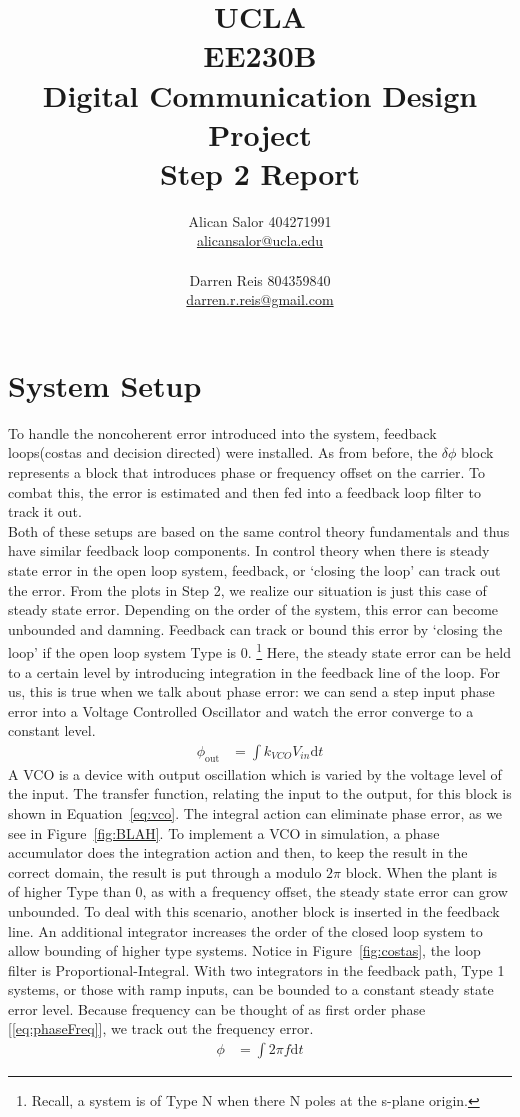 \documentclass[]{article}
\title{UCLA\\EE230B\\Digital Communication Design Project\\Step 2 Report}
\author{Alican Salor 404271991 \\  \href{mailto:alicansalor@ucla.edu}{alicansalor@ucla.edu} \\ \\
Darren Reis 804359840 \\
\href{mailto:darrer.r.reis@gmail.com}{darren.r.reis@gmail.com} }
\begin{document}
\maketitle

\newpage
\tableofcontents

\newpage


\section{System Setup}
\label{sec:setup}
To handle the noncoherent error introduced into the system, feedback loops(costas and decision directed) were installed.  As from before, the $\delta\phi$ block represents a block that introduces phase or frequency offset on the carrier.  To combat this, the error is estimated and then fed into a feedback loop filter to track it out. \\

Both of these setups are based on the same control theory fundamentals and thus have similar feedback loop components. In control theory when there is steady state error in the open loop system, feedback, or `closing the loop' can track out the error.  From the plots in Step 2, we realize our situation is just this case of steady state error.  Depending on the order of the system, this error can become unbounded and damning.  Feedback can track or bound this error by `closing the loop' if the open loop system Type is 0.  \footnote{Recall, a system is of Type N when there N poles at the s-plane origin.}  Here, the steady state error can be held to a certain level by introducing integration in the feedback line of the loop.  For us, this is true when we talk about phase error: we can send a step input phase error into a Voltage Controlled Oscillator and watch the error converge to a constant level. 
\begin{align}
\label{eq:vco}
\phi_{\text{out}} &= \int \! k_{VCO}V_{in} \mathrm{d}t
\end{align}
A VCO is a device with output oscillation which is varied by the voltage level of the input.  The transfer function, relating the input to the output, for this block is shown in Equation~\ref{eq:vco}. The integral action can eliminate phase error, as we see in Figure~\ref{fig:BLAH}.  To implement a VCO in simulation, a phase accumulator does the integration   action and then, to keep the result in the correct domain, the result is put through a modulo $2\pi$ block.   
When the plant is of higher Type than 0, as with a frequency offset, the steady state error can grow unbounded.  To deal with this scenario, another block is inserted in the feedback line.  An additional integrator increases the order of the closed loop system to allow bounding of higher type systems.  Notice in Figure~\ref{fig:costas}, the loop filter is Proportional-Integral.  With two integrators in the feedback path, Type 1 systems, or those with ramp inputs, can be bounded to a constant steady state error level.  Because frequency can be thought of as first order phase [\ref{eq:phaseFreq}], we track out the frequency error.\\
\begin{align}
\label{eq:phaseFreq}
\phi &= \int \! 2\pi f \mathrm{d}t 
\end{align}
\end{document}
